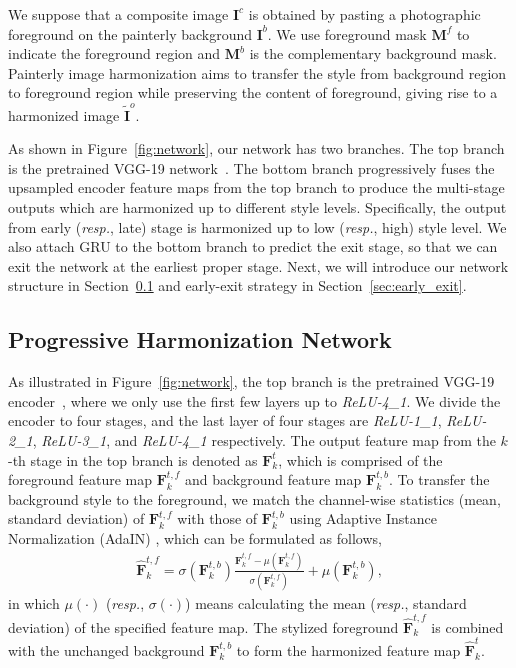 \documentclass[letterpaper]{article} %
\begin{document}
We suppose that a composite image $\bm{I}^c$ is obtained by pasting a photographic foreground on the painterly background $\bm{I}^b$. We use foreground mask $\bm{M}^f$ to indicate the foreground region and $\bm{M}^b$ is the complementary background mask. Painterly image harmonization aims to transfer the style from background region to foreground region while preserving the content of foreground, giving rise to a harmonized image $\tilde{\bm{I}}^o$.

As shown in Figure~\ref{fig:network}, our network has two branches. The top branch is the pretrained VGG-19 network~\cite{VGG19}. The bottom branch progressively fuses the upsampled encoder feature maps from the top branch to produce the multi-stage outputs which are harmonized up to different style levels. Specifically, the output from early (\emph{resp.}, late) stage is harmonized up to low (\emph{resp.}, high) style level. 
We also attach GRU to the bottom branch to predict the exit stage, so that we can exit the network at the earliest proper stage. Next, we will introduce our network structure in Section~\ref{sec:main_network} and early-exit strategy in Section~\ref{sec:early_exit}.

\subsection {Progressive Harmonization Network} \label{sec:main_network}

As illustrated in Figure~\ref{fig:network}, the top branch is the pretrained VGG-19 encoder~\cite{VGG19}, where we only use the first few layers up to \emph{ReLU-4\_1}. We divide the encoder to four stages, and the last layer of four stages are \emph{ReLU-1\_1}, \emph{ReLU-2\_1}, \emph{ReLU-3\_1}, and \emph{ReLU-4\_1} respectively. The output feature map from the $k$-th stage in the top branch is denoted as $\bm{F}^{t}_k$, which is comprised of the foreground feature map  $\bm{F}^{t,f}_k$ and background feature map  $\bm{F}^{t,b}_k$. To transfer the background style to the foreground, we match the channel-wise statistics (mean, standard deviation) of $\bm{F}^{t,f}_k$ with those of $\bm{F}^{t,b}_k$ using Adaptive Instance Normalization (AdaIN) \cite{huang2017arbitrary}, which can be formulated as follows,
\begin{eqnarray}\label{eqn:adain} 
    \hat{\bm{F}}^{t,f}_{k} = \sigma(\bm{F}^{t,b}_k)\frac{\bm{F}^{t,f}_k-\mu(\bm{F}^{t,f}_k)}{\sigma(\bm{F}^{t,f}_k)} + \mu(\bm{F}^{t,b}_k),
\end{eqnarray}
in which $\mu(\cdot)$ (\emph{resp.}, $\sigma(\cdot)$) means calculating the mean (\emph{resp.}, standard deviation) of the specified feature map. The stylized foreground $\hat{\bm{F}}^{t,f}_{k}$ is combined with the unchanged background $\bm{F}^{t,b}_k$ to form the harmonized feature map $\hat{\bm{F}}^{t}_{k}$.  
\end{document}
